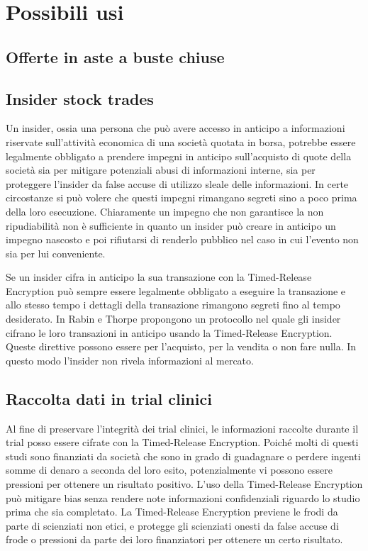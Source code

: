 \chapter{Possibili usi}
\label{chap:possibili-usi}

\section{Offerte in aste a buste chiuse}

\section{Insider stock trades}
Un insider, ossia una persona che può avere accesso in anticipo a informazioni
riservate sull’attività economica di una società quotata in borsa,
potrebbe essere legalmente obbligato a
prendere impegni in anticipo sull'acquisto di quote della società
sia per mitigare potenziali
abusi di informazioni interne, sia per proteggere l'insider da false
accuse di utilizzo sleale delle informazioni.
In certe circostanze
si può volere che questi impegni rimangano segreti sino a poco prima
della loro esecuzione. Chiaramente un impegno che non garantisce la non ripudiabilità
non è sufficiente in quanto un insider può creare in anticipo un impegno nascosto
e poi rifiutarsi di renderlo pubblico nel caso in cui l'evento non sia per lui conveniente.

Se un insider cifra in anticipo la sua transazione con la Timed-Release Encryption
può sempre essere legalmente obbligato a eseguire la transazione e allo stesso tempo
i dettagli della transazione rimangono segreti fino al tempo desiderato.
In \cite{rabin2006time} Rabin e Thorpe propongono un protocollo nel quale gli insider
cifrano le loro transazioni in anticipo usando la Timed-Release Encryption.
Queste direttive possono essere per l'acquisto, per la vendita o non fare nulla. In questo
modo l'insider non rivela informazioni al mercato.

\section{Raccolta dati in trial clinici}
Al fine di preservare l'integrità dei trial clinici, le informazioni raccolte durante il trial
posso essere cifrate con la Timed-Release Encryption.
Poiché molti di questi studi sono finanziati da società che sono in grado di guadagnare
o perdere ingenti somme di denaro a seconda del loro esito,
potenzialmente vi possono essere pressioni per ottenere un risultato positivo.
L'uso della Timed-Release Encryption può mitigare bias senza rendere note informazioni
confidenziali riguardo lo studio prima che sia completato. La Timed-Release Encryption
previene le frodi da parte di scienziati non etici, e protegge gli scienziati onesti
da false accuse di frode o pressioni da parte dei loro finanziatori per ottenere un certo risultato.

